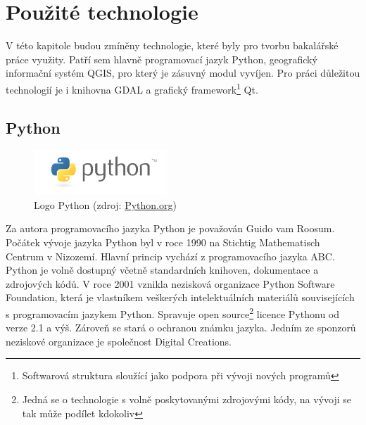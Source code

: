 \chapter{Použité technologie}
\label{3-technologie}
V této kapitole budou zmíněny technologie, které byly pro tvorbu
bakalářské práce využity. Patří sem hlavně programovací jazyk Python,
geografický informační systém QGIS, pro který je zásuvný modul vyvíjen.
Pro práci důležitou technologií je i knihovna GDAL a grafický
framework\footnote{Softwarová struktura sloužící jako podpora při
  vývoji nových programů} Qt.

\section{Python}
\label{sec:python}
\begin{figure}[H]
	 \centering
      \includegraphics[width=5cm]{./pictures/python-logo.png}
      \caption{Logo Python (zdroj:
\href{https://www.python.org/static/community_logos/python-logo-master-v3-TM.png}{Python.org})}
      \label{fig:python}
  \end{figure}

Za autora programovacího jazyka Python je považován Guido vam Roosum.
Počátek vývoje jazyka Python byl v roce 1990 na Stichtig Mathematisch
Centrum v Nizozemí. Hlavní princip
vychází z programovacího jazyka ABC. Python je volně dostupný včetně
standardních knihoven, dokumentace a zdrojových kódů. V roce 2001
vznikla nezisková organizace Python Software Foundation, která je
vlastníkem veškerých intelektuálních materiálů souvisejících s
programovacím jazykem
Python. Spravuje open source\footnote{Jedná se o technologie s volně
  poskytovanými zdrojovými kódy, na vývoji se tak může podílet
  kdokoliv} licence Pythonu od verze 2.1 a výš. Zároveň se stará o
ochranou známku jazyka. Jedním ze sponzorů neziskové organizace je
společnost Digital Creations. \cite{ucebnicepython}

